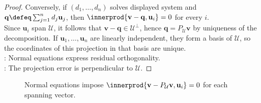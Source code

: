 \begin{theorem}
\begin{proof}
Conversely, if $(d_1,\ldots,d_n)$ solves displayed system and $\mathbf{q}\defeq\sum_{j=1}^{n}d_j\mathbf{u}_j$, then $\innerprod{\mathbf{v}-\mathbf{q},\mathbf{u}_i}=0$ for every $i$.\\
Since $\mathbf{u}_i$ span $\mathcal{U}$, it follows that $\mathbf{v}-\mathbf{q}\in\mathcal{U}^{\perp}$, hence $\mathbf{q}=P_{\mathcal{U}}\mathbf{v}$ by uniqueness of the decomposition. If $\mathbf{u}_1,\ldots,\mathbf{u}_n$ are linearly independent, they form a basis of $\mathcal{U}$, so the coordinates of this projection in that basis are unique.\\
: Normal equations express residual orthogonality.\\
: The projection error is perpendicular to $\mathcal{U}$.
\end{proof}
\end{theorem}

\begin{figure}[H]
  \centering
  
  \caption{Normal equations impose $\innerprod{\mathbf{v}-P_{\mathcal{U}}\mathbf{v},\mathbf{u}_i}=0$ for each spanning vector.}
  \label{fig:normal-equations-projection}
\end{figure}

